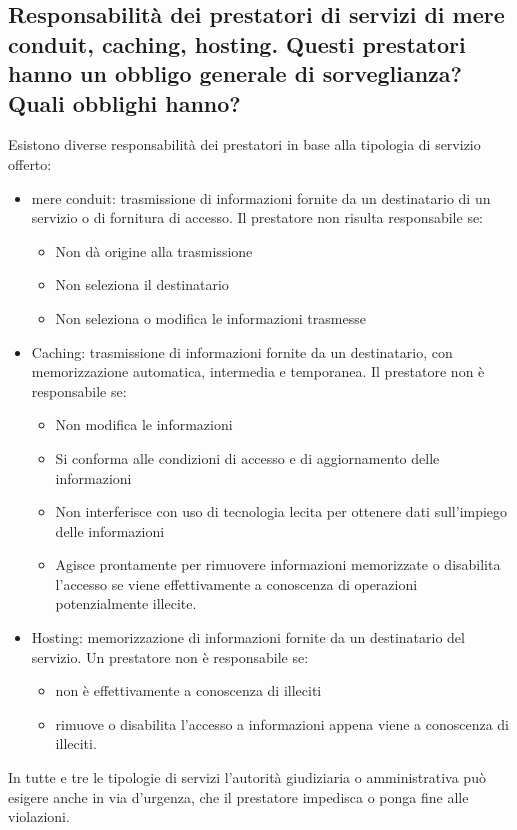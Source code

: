 \subsection{Responsabilità dei prestatori di servizi di mere conduit, caching, hosting. Questi prestatori
hanno un obbligo generale di sorveglianza? Quali obblighi hanno?}
Esistono diverse responsabilità dei prestatori in base alla tipologia di servizio offerto:
\begin{itemize}
    \item mere conduit: trasmissione di informazioni fornite da un destinatario di un servizio o di fornitura di accesso.
    Il prestatore non risulta responsabile se:
    \begin{itemize}
        \item Non dà origine alla trasmissione
        \item Non seleziona il destinatario
        \item Non seleziona o modifica le informazioni trasmesse
    \end{itemize}
    \item Caching: trasmissione di informazioni fornite da un destinatario, con memorizzazione automatica, intermedia e temporanea.
    Il prestatore non è responsabile se:
    \begin{itemize}
        \item Non modifica le informazioni
        \item Si conforma alle condizioni di accesso e di aggiornamento delle informazioni
        \item Non interferisce con uso di tecnologia lecita per ottenere dati sull'impiego delle informazioni
        \item Agisce prontamente per rimuovere informazioni memorizzate o disabilita l'accesso se viene effettivamente a conoscenza di operazioni potenzialmente illecite.
    \end{itemize}
   \item Hosting: memorizzazione di informazioni fornite da un destinatario del servizio.
   Un prestatore non è responsabile se:
   \begin{itemize}
       \item non è effettivamente a conoscenza di illeciti
       \item rimuove o disabilita l'accesso a informazioni appena viene a conoscenza di illeciti.
   \end{itemize}
\end{itemize}
In tutte e tre le tipologie di servizi l'autorità giudiziaria o amministrativa può esigere anche in via d'urgenza, che il prestatore impedisca o ponga fine alle violazioni.
